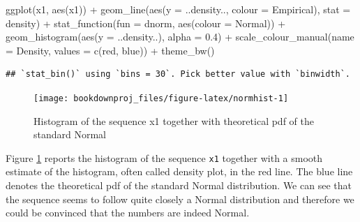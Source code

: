\documentclass[
]{book}
\newenvironment{Shaded}{\begin{snugshade}}{\end{snugshade}}
\newcommand{\AttributeTok}[1]{\textcolor[rgb]{0.77,0.63,0.00}{#1}}
\newcommand{\FloatTok}[1]{\textcolor[rgb]{0.00,0.00,0.81}{#1}}
\newcommand{\FunctionTok}[1]{\textcolor[rgb]{0.00,0.00,0.00}{#1}}
\newcommand{\NormalTok}[1]{#1}
\newcommand{\SpecialCharTok}[1]{\textcolor[rgb]{0.00,0.00,0.00}{#1}}
\newcommand{\StringTok}[1]{\textcolor[rgb]{0.31,0.60,0.02}{#1}}
\theoremstyle{definition}
\theoremstyle{definition}
\theoremstyle{definition}
\theoremstyle{definition}
\theoremstyle{remark}
\begin{document}
\begin{Shaded}
\begin{Highlighting}[]
\FunctionTok{ggplot}\NormalTok{(x1, }\FunctionTok{aes}\NormalTok{(x1)) }\SpecialCharTok{+}
   \FunctionTok{geom\_line}\NormalTok{(}\FunctionTok{aes}\NormalTok{(}\AttributeTok{y =}\NormalTok{ ..density.., }\AttributeTok{colour =} \StringTok{\textquotesingle{}Empirical\textquotesingle{}}\NormalTok{), }\AttributeTok{stat =} \StringTok{\textquotesingle{}density\textquotesingle{}}\NormalTok{) }\SpecialCharTok{+}
   \FunctionTok{stat\_function}\NormalTok{(}\AttributeTok{fun =}\NormalTok{ dnorm, }\FunctionTok{aes}\NormalTok{(}\AttributeTok{colour =} \StringTok{\textquotesingle{}Normal\textquotesingle{}}\NormalTok{)) }\SpecialCharTok{+}      
   \FunctionTok{geom\_histogram}\NormalTok{(}\FunctionTok{aes}\NormalTok{(}\AttributeTok{y =}\NormalTok{ ..density..), }\AttributeTok{alpha =} \FloatTok{0.4}\NormalTok{) }\SpecialCharTok{+}      
   \FunctionTok{scale\_colour\_manual}\NormalTok{(}\AttributeTok{name =} \StringTok{\textquotesingle{}Density\textquotesingle{}}\NormalTok{, }\AttributeTok{values =} \FunctionTok{c}\NormalTok{(}\StringTok{\textquotesingle{}red\textquotesingle{}}\NormalTok{, }\StringTok{\textquotesingle{}blue\textquotesingle{}}\NormalTok{)) }\SpecialCharTok{+}
   \FunctionTok{theme\_bw}\NormalTok{()}
\end{Highlighting}
\end{Shaded}

\begin{verbatim}
## `stat_bin()` using `bins = 30`. Pick better value with `binwidth`.
\end{verbatim}

\begin{figure}

{\centering \texttt{[image: bookdownproj\_files/figure-latex/normhist-1]} 

}

\caption{Histogram of the sequence x1 together with theoretical pdf of the standard Normal}\label{fig:normhist}
\end{figure}

Figure \ref{fig:normhist} reports the histogram of the sequence \texttt{x1} together with a smooth estimate of the histogram, often called density plot, in the red line. The blue line denotes the theoretical pdf of the standard Normal distribution. We can see that the sequence seems to follow quite closely a Normal distribution and therefore we could be convinced that the numbers are indeed Normal.
\end{document}
